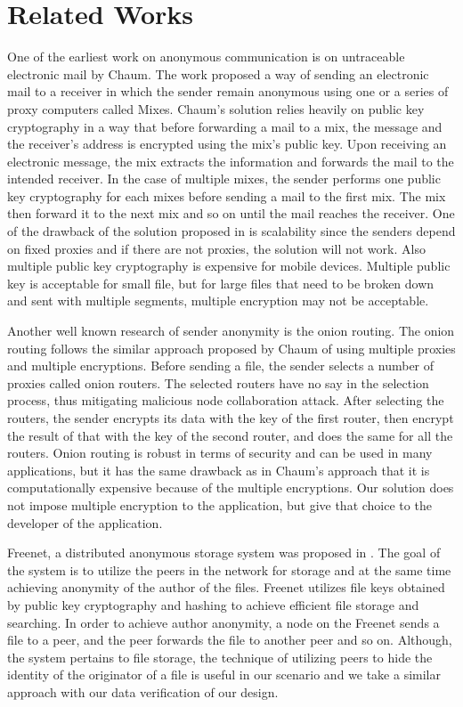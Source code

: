 \section{Related Works}\label{sec-related-works}
One of the earliest work on anonymous communication is on untraceable
electronic mail by Chaum\cite{DBLP:journals/cacm/Chaum81}. The work proposed
a way of sending an electronic mail to a receiver in which the sender
remain anonymous using one or a series of proxy computers called Mixes.
Chaum's solution relies heavily on public key cryptography in a way that
before forwarding a mail to a mix, the message and the receiver's address
is encrypted using the mix's public key. Upon receiving an electronic
message, the mix extracts the information
and forwards the mail to the intended receiver. In the case of multiple
mixes, the sender performs one public key cryptography for each mixes before
sending a mail to the first mix. The mix then forward it to the next mix
and so on until the mail reaches the receiver. One of the drawback of the
solution proposed in \cite{DBLP:journals/cacm/Chaum81} is scalability since
the senders depend on fixed proxies and if there are not proxies, the
solution will not work. Also multiple public key cryptography is expensive
for mobile devices. Multiple public key is acceptable for small file, but
for large files that need to be broken down and sent with multiple segments,
multiple encryption may not be acceptable.

Another well known research of sender anonymity is the
onion routing\cite{DBLP:conf/uss/DingledineMS04}. The onion routing
follows the similar approach proposed by Chaum of
using multiple proxies and multiple encryptions. Before sending a file,
the sender selects a number of proxies called onion routers. The selected
routers have no say in the selection process, thus mitigating malicious
node collaboration attack. After selecting the routers, the sender
encrypts its data with the key of the first router, then encrypt the result
of that with the key of the second router, and does the same for all the
routers. Onion routing is robust in terms
of security and can be used in many applications, but it has the same
drawback as in Chaum's approach that it is computationally expensive
because of the multiple encryptions. Our solution does not impose multiple
encryption to the application, but give that choice to the developer
of the application.

Freenet, a distributed anonymous storage system was proposed
in \cite{DBLP:conf/diau/ClarkeSWH00}. The goal of the system is to utilize
the peers in the network for storage and at the same time achieving anonymity
of the author of the files. Freenet utilizes file keys obtained by public
key cryptography and hashing to achieve efficient file storage and searching.
In order to achieve author anonymity, a node on the Freenet sends a file
to a peer, and the peer forwards the file to another peer and so on.
Although, the system pertains to file storage,
the technique of utilizing peers to hide the identity of the originator of
a file is useful in our scenario and we take a similar approach with our
data verification of our design.

